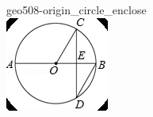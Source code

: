 \documentclass[12pt]{article}
\begin{document}
\begin{center}
\begin{minipage}{0.32\textwidth}
\end{minipage}
\hfill\begin{minipage}{0.32\textwidth}\centering
geo508-origin\_circle\_enclose\\
\includegraphics[width=0.95\linewidth]{out_rommath_origin/items/geo508-origin/assets/figure_circle.png}
\end{minipage}
\par
\end{center}
\bigskip
\end{document}
